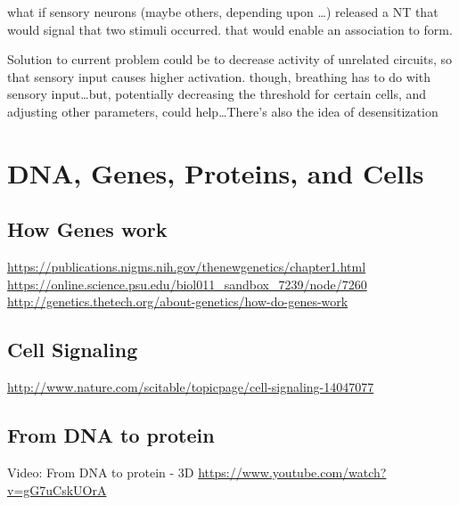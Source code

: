 \documentclass[11pt, a4paper, oneside]{article}   	%
\begin{document}
what if sensory neurons (maybe others, depending upon \ldots ) released a NT that would signal that two stimuli occurred. that would enable an association to form.


Solution to current problem could be to decrease activity of unrelated circuits, so that sensory input causes higher activation. though, breathing has to do with sensory input\ldots but, potentially decreasing the threshold for certain cells, and adjusting other parameters, could help\ldots There's also the idea of desensitization

\section{DNA, Genes, Proteins, and Cells}

\subsection{How Genes work}
\url{https://publications.nigms.nih.gov/thenewgenetics/chapter1.html}
\url{https://online.science.psu.edu/biol011_sandbox_7239/node/7260}
\url{http://genetics.thetech.org/about-genetics/how-do-genes-work}

\subsection{Cell Signaling}
\url{http://www.nature.com/scitable/topicpage/cell-signaling-14047077}

\subsection{From DNA to protein}

Video: From DNA to protein - 3D
\url{https://www.youtube.com/watch?v=gG7uCskUOrA}
\end{document}
